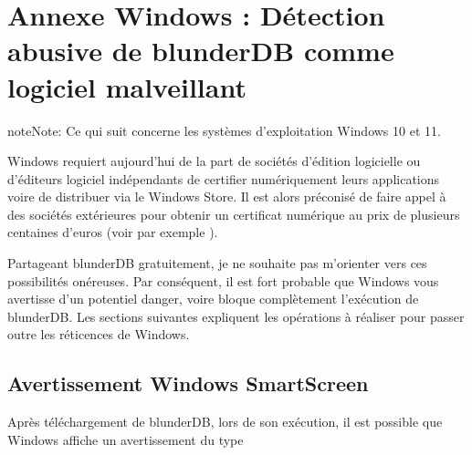 \documentclass[letterpaper,10pt,french]{sphinxmanual}
\begin{document}
\sphinxstepscope


\section{Annexe Windows : Détection abusive de blunderDB comme logiciel malveillant}
\label{\detokenize{annexe_windows_securite:annexe-windows-detection-abusive-de-blunderdb-comme-logiciel-malveillant}}\label{\detokenize{annexe_windows_securite:annexe-windows-malware}}\label{\detokenize{annexe_windows_securite::doc}}
\begin{sphinxadmonition}{note}{Note:}
\sphinxAtStartPar
Ce qui suit concerne les systèmes d’exploitation Windows 10 et 11.
\end{sphinxadmonition}

\sphinxAtStartPar
Windows requiert aujourd’hui de la part de sociétés d’édition logicielle ou
d’éditeurs logiciel indépendants de certifier numériquement leurs applications
voire de distribuer via le Windows Store. Il est alors préconisé de faire appel
à des sociétés extérieures pour obtenir un certificat numérique au prix de
plusieurs centaines d’euros (voir par exemple
).

\sphinxAtStartPar
Partageant blunderDB gratuitement, je ne souhaite pas m’orienter vers ces
possibilités onéreuses. Par conséquent, il est fort probable que Windows vous
avertisse d’un potentiel danger, voire bloque complètement l’exécution de
blunderDB. Les sections suivantes expliquent les opérations à réaliser pour
passer outre les réticences de Windows.


\subsection{Avertissement Windows SmartScreen}
\label{\detokenize{annexe_windows_securite:avertissement-windows-smartscreen}}
\sphinxAtStartPar
Après téléchargement de blunderDB, lors de son exécution, il est possible que
Windows affiche un avertissement du type

\begin{figure}[htbp]
\centering

\noindent{}
\end{figure}
\end{document}
